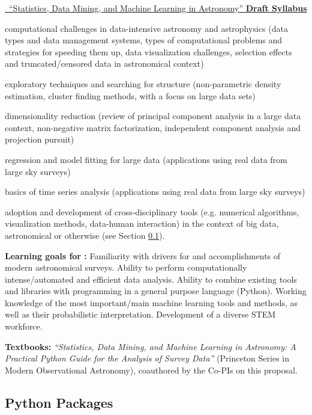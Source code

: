 \vskip 0.2in
\item \underline{\astrocl~``Statistics, Data Mining, and Machine Learning in Astronomy'' {\bf Draft Syllabus}} \\
\bit
\item computational challenges in data-intensive astronomy and astrophysics 
(data types and data management systems, types of computational problems and 
strategies for speeding them up, data visualization challenges,
selection effects and truncated/censored data in astronomical context)
\item exploratory techniques and searching for structure (non-parametric density estimation,
cluster finding methods, with a focus on large data sets)
\item dimensionality reduction (review of principal component analysis in a large data context,
non-negative matrix factorization, independent component analysis and projection pursuit)
\item regression and model fitting for large data (applications using real data from large sky surveys)
\item basics of time series analysis (applications using real data from large sky surveys)
\item adoption and development of cross-disciplinary tools (e.g. numerical algorithms, visualization 
methods, data-human interaction) in the context of big data, astronomical or otherwise 
(see Section \ref{sec:Python}).
\eit

\item[]{\bf Learning goals for \astrocl:}  Familiarity with drivers for and accomplishments 
of modern astronomical surveys. Ability to perform computationally intense/automated and 
efficient data analysis. Ability to combine existing tools and libraries with programming in a 
general purpose language (Python). Working knowledge of the most important/main machine 
learning tools and methods, as well as their probabilistic interpretation. Development of a 
diverse STEM workforce. 

{\bf Textbooks:} {\it ``Statistics, Data Mining, and Machine Learning in
  Astronomy: A Practical Python Guide for the Analysis of Survey
  Data''} (Princeton Series in Modern Observational Astronomy),  coauthored by the Co-PIs on 
this proposal.

\eit

\subsection{Python Packages} 
\label{sec:Python}


